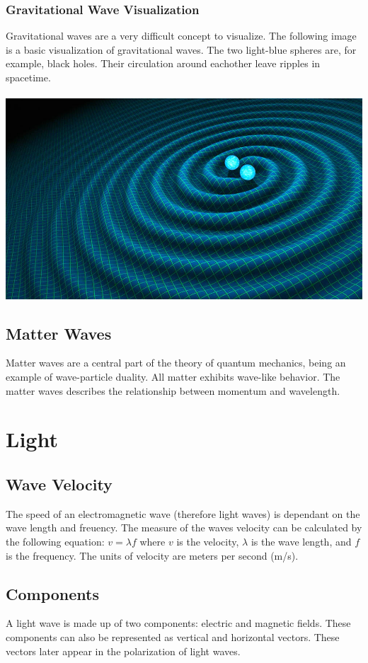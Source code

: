 \documentclass{article}
\begin{document}
\subsubsection{Gravitational Wave Visualization}
Gravitational waves are a very difficult concept to visualize. The following image is a basic visualization of gravitational waves. The two light-blue spheres are, for example, black holes. Their circulation around eachother leave ripples in spacetime.\\\\
\includegraphics[scale=0.33]{images/gravitational_waves.png}

\subsection{Matter Waves}
Matter waves are a central part of the theory of quantum mechanics, being an example of wave-particle duality. All matter exhibits wave-like behavior. The matter waves describes the relationship between momentum and wavelength.


\section{Light}
\subsection{Wave Velocity}
The speed of an electromagnetic wave (therefore light waves) is dependant on the wave length and freuency. The measure of the waves velocity can be calculated by the following equation: $v = \lambda f$ where $v$ is the velocity, $\lambda$ is the wave length, and $f$ is the frequency. The units of velocity are meters per second (m/s).

\subsection{Components}
A light wave is made up of two components: electric and magnetic fields. These components can also be represented as vertical and horizontal vectors. These vectors later appear in the polarization of light waves.
\end{document}
